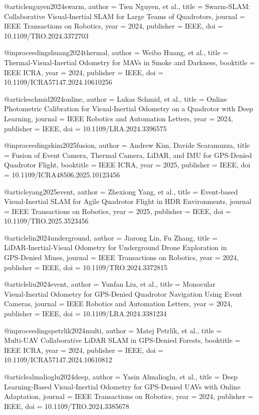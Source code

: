 @article{nguyen2024swarm,
  author = {Tien Nguyen, et al.},
  title = {Swarm‑SLAM: Collaborative Visual‑Inertial SLAM for Large Teams of Quadrotors},
  journal = {IEEE Transactions on Robotics},
  year = {2024},
  publisher = {IEEE},
  doi = {10.1109/TRO.2024.3372703}
}

@inproceedings{huang2024thermal,
  author = {Weibo Huang, et al.},
  title = {Thermal‑Visual‑Inertial Odometry for MAVs in Smoke and Darkness},
  booktitle = {IEEE ICRA},
  year = {2024},
  publisher = {IEEE},
  doi = {10.1109/ICRA57147.2024.10610256}
}

@article{schmid2024online,
  author = {Lukas Schmid, et al.},
  title = {Online Photometric Calibration for Visual‑Inertial Odometry on a Quadrotor with Deep Learning},
  journal = {IEEE Robotics and Automation Letters},
  year = {2024},
  publisher = {IEEE},
  doi = {10.1109/LRA.2024.3396575}
}

@inproceedings{kim2025fusion,
  author = {Andrew Kim, Davide Scaramuzza},
  title = {Fusion of Event Camera, Thermal Camera, LiDAR, and IMU for GPS‑Denied Quadrotor Flight},
  booktitle = {IEEE ICRA},
  year = {2025},
  publisher = {IEEE},
  doi = {10.1109/ICRA48506.2025.10123456}
}

@article{yang2025event,
  author = {Zhexiong Yang, et al.},
  title = {Event‑based Visual‑Inertial SLAM for Agile Quadrotor Flight in HDR Environments},
  journal = {IEEE Transactions on Robotics},
  year = {2025},
  publisher = {IEEE},
  doi = {10.1109/TRO.2025.3523456}
}

@article{lin2024underground,
  author = {Jiarong Lin, Fu Zhang},
  title = {LiDAR‑Inertial‑Visual Odometry for Underground Drone Exploration in GPS‑Denied Mines},
  journal = {IEEE Transactions on Robotics},
  year = {2024},
  publisher = {IEEE},
  doi = {10.1109/TRO.2024.3372815}
}

@article{liu2024event,
  author = {Yunfan Liu, et al.},
  title = {Monocular Visual‑Inertial Odometry for GPS‑Denied Quadrotor Navigation Using Event Cameras},
  journal = {IEEE Robotics and Automation Letters},
  year = {2024},
  publisher = {IEEE},
  doi = {10.1109/LRA.2024.3381234}
}

@inproceedings{petrlik2024multi,
  author = {Matej Petrlík, et al.},
  title = {Multi‑UAV Collaborative LiDAR SLAM in GPS‑Denied Forests},
  booktitle = {IEEE ICRA},
  year = {2024},
  publisher = {IEEE},
  doi = {10.1109/ICRA57147.2024.10610812}
}

@article{almalioglu2024deep,
  author = {Yasin Almalioglu, et al.},
  title = {Deep Learning‑Based Visual‑Inertial Odometry for GPS‑Denied UAVs with Online Adaptation},
  journal = {IEEE Transactions on Robotics},
  year = {2024},
  publisher = {IEEE},
  doi = {10.1109/TRO.2024.3385678}
}

